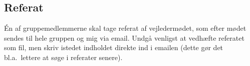 \subsection{Referat}
\label{subsec:summary}
\'En af gruppemedlemmerne skal tage referat af vejledermødet, som efter mødet sendes til hele gruppen og mig via email.
Undgå venligst at vedhæfte referatet som fil, men skriv istedet indholdet direkte ind i emailen (dette gør det bl.a.\ lettere at søge i referater senere).

